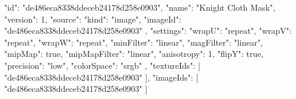 {
  "id": "de486eca8338ddeceb24178d258e0903",
  "name": "Knight Cloth Mask",
  "version": 1,
  "source": {
    "kind": "image",
    "imageId": "de486eca8338ddeceb24178d258e0903"
  },
  "settings": {
    "wrapU": "repeat",
    "wrapV": "repeat",
    "wrapW": "repeat",
    "minFilter": "linear",
    "magFilter": "linear",
    "mipMap": true,
    "mipMapFilter": "linear",
    "anisotropy": 1,
    "flipY": true,
    "precision": "low",
    "colorSpace": "srgb"
  },
  "textureIds": [
    "de486eca8338ddeceb24178d258e0903"
  ],
  "imageIds": [
    "de486eca8338ddeceb24178d258e0903"
  ]
}
